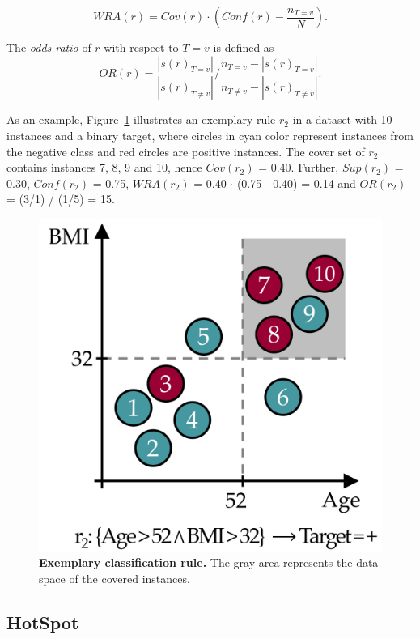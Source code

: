 \documentclass[
  oneside]{book}
\begin{document}
\begin{equation}
WRA(r) = Cov(r)\cdot \left(Conf(r)-\frac{n_{T=v}}{N} \right).
\label{eq:03-wra}
\end{equation}

The \emph{odds ratio} of \(r\) with respect to \(T=v\) is defined as
\begin{equation}
OR(r) = \frac{ |s(r)_{T=v}| }{|s(r)_{T\neq v}|} / \frac{n_{T=v} -  |s(r)_{T=v}| }{ n_{T\neq v} -  |s(r)_{T\neq v}|}.
\label{eq:03-odds}
\end{equation}

As an example, Figure~\ref{fig:03-rule-intro} illustrates an exemplary rule \(r_2\) in a dataset with 10 instances and a binary target, where circles in cyan color represent instances from the negative class and red circles are positive instances.
The cover set of \(r_2\) contains instances 7, 8, 9 and 10, hence \(Cov(r_2)\) = 0.40.
Further, \(Sup(r_2)\) = 0.30, \(Conf(r_2)\) = 0.75, \(WRA(r_2)\) = 0.40 \(\cdot\) (0.75 - 0.40) = 0.14 and \(OR(r_2)\) = (3/1) / (1/5) = 15.



\begin{figure}[htb]

{\centering \includegraphics[width=0.5\linewidth]{figures/03-rule-intro} 

}

\caption{\textbf{Exemplary classification rule.} The gray area represents the data space of the covered instances.}\label{fig:03-rule-intro}
\end{figure}

\hypertarget{imm-workflow-hotspot}{%
\subsection{HotSpot}\label{imm-workflow-hotspot}}
\end{document}
